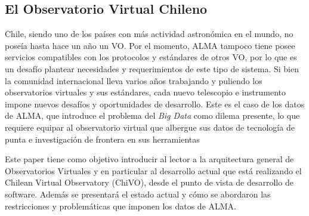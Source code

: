 \subsection{El Observatorio Virtual Chileno}
Chile, siendo uno de los países con más actividad astronómica en el mundo, no poseía hasta
hace un año un VO. Por el momento, ALMA tampoco tiene posee servicios
compatibles con los protocolos y estándares de otros VO, por lo que es un desafío
plantear necesidades y requerimientos de este tipo de sistema.
Si bien la comunidad internacional lleva varios años trabajando y puliendo
los observatorios virtuales y sus estándares, cada nuevo telescopio e
instrumento impone nuevos desafíos y oportunidades de desarrollo. 
Este es el caso de los datos de ALMA, que introduce el problema del
\emph{Big Data} como dilema presente, lo que requiere equipar al 
observatorio virtual que albergue sus datos de tecnología de punta 
e investigación de frontera en sus herramientas

Este paper tiene como objetivo introducir al lector a la arquitectura general de
Observatorios Virtuales y en particular al desarrollo actual que está
realizando el Chilean Virtual Observatory (ChiVO), desde el punto de vista de
desarrollo de software. Además se presentará el estado actual y cómo se
abordaron las restricciones y problemáticas que imponen los datos de ALMA.

